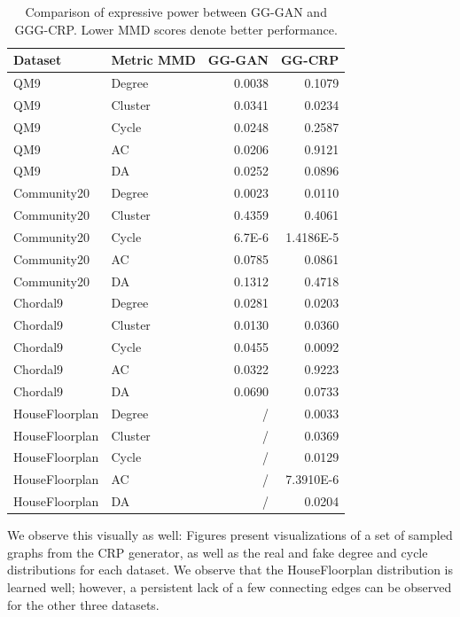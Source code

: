 \begin{table}[H]
\centering
\caption[Comparison of expressive power between GG-GAN and GGG-CRP.]{Comparison of expressive power between GG-GAN and GGG-CRP. Lower MMD scores denote better performance.}
\label{tab:expressive_power}
\begin{tabular}{llrr}
\toprule
Dataset & Metric MMD & GG-GAN & GG-CRP \\
\midrule
QM9 & Degree & 0.0038 & 0.1079\\
QM9 & Cluster & 0.0341 & 0.0234 \\
QM9 & Cycle & 0.0248 & 0.2587 \\
QM9 & AC & 0.0206 & 0.9121 \\
QM9 & DA & 0.0252 & 0.0896 \\
Community20 & Degree & 0.0023 & 0.0110 \\
Community20 & Cluster & 0.4359 & 0.4061 \\
Community20 & Cycle & 6.7E-6 & 1.4186E-5 \\
Community20 & AC & 0.0785 & 0.0861 \\
Community20 & DA & 0.1312 & 0.4718 \\
Chordal9 & Degree & 0.0281 & 0.0203 \\
Chordal9 & Cluster & 0.0130 & 0.0360 \\
Chordal9 & Cycle & 0.0455 & 0.0092 \\
Chordal9 & AC & 0.0322 & 0.9223 \\
Chordal9 & DA & 0.0690 & 0.0733 \\
HouseFloorplan & Degree & / & 0.0033 \\
HouseFloorplan & Cluster & / & 0.0369 \\
HouseFloorplan & Cycle & / & 0.0129 \\
HouseFloorplan & AC & / & 7.3910E-6 \\
HouseFloorplan & DA & / & 0.0204 \\
\bottomrule
\end{tabular}
\end{table}

We observe this visually as well: Figures  present visualizations of a set of sampled graphs from the CRP generator, as well as the real and fake degree and cycle distributions for each dataset. We observe that the HouseFloorplan distribution is learned well; however, a persistent lack of a few connecting edges can be observed for the other three datasets.

